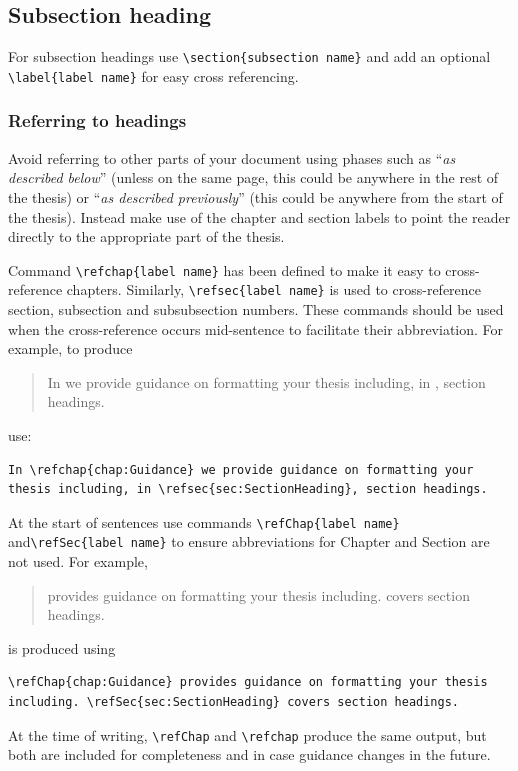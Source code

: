 \documentclass[12pt,oneside]{book} %
\begin{document}
\subsection{Subsection heading}
\label{sec:SubsectionHeading}
For subsection headings use \verb#\section{subsection name}# and add an optional \linebreak\verb#\label{label name}# for easy cross referencing. 

\subsubsection{Referring to headings}
Avoid referring to other parts of your document using phases such as ``{\em as described below}'' (unless on the same page, this could be anywhere in the rest of the thesis) or ``{\em as described previously}''  (this could be anywhere from the start of the thesis). Instead make use of the chapter and section labels to point the reader directly to the appropriate part of the thesis. 

Command \verb#\refchap{label name}# has been defined to make it easy to cross-refer\-ence chapters. Similarly, \verb#\refsec{label name}# is used to cross-reference section, subsection and subsubsection numbers. These commands should be used  when the cross-reference occurs mid-sentence to facilitate their abbreviation. For example, to produce
\begin{quote}
In  we provide guidance on formatting your thesis including, in , section headings. 
\end{quote}
use:
\begin{verbatim}
In \refchap{chap:Guidance} we provide guidance on formatting your 
thesis including, in \refsec{sec:SectionHeading}, section headings. 
\end{verbatim}

At the start of sentences use commands \verb#\refChap{label name}# and\linebreak \verb#\refSec{label name}# to ensure abbreviations for Chapter and Section are not used. For example,
\begin{quote}
 provides guidance on formatting your thesis
including.  covers section headings. 
\end{quote}
is produced using
\begin{verbatim}
\refChap{chap:Guidance} provides guidance on formatting your thesis
including. \refSec{sec:SectionHeading} covers section headings. 
\end{verbatim}
At the time of writing, \verb#\refChap# and \verb#\refchap# produce the same output, but both are included for completeness and in case guidance changes in the future.
\end{document}
